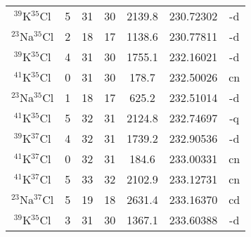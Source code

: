 \begin{table*}[htp]
\begin{tabular}{ccccccc}
$^{39}$K$^{35}$Cl & 5 & 31 & 30 & 2139.8 & 230.72302 & -d \\
$^{23}$Na$^{35}$Cl & 2 & 18 & 17 & 1138.6 & 230.77811 & -d \\
$^{39}$K$^{35}$Cl & 4 & 31 & 30 & 1755.1 & 232.16021 & -d \\
$^{41}$K$^{35}$Cl & 0 & 31 & 30 & 178.7 & 232.50026 & cn \\
$^{23}$Na$^{35}$Cl & 1 & 18 & 17 & 625.2 & 232.51014 & -d \\
$^{41}$K$^{35}$Cl & 5 & 32 & 31 & 2124.8 & 232.74697 & -q \\
$^{39}$K$^{37}$Cl & 4 & 32 & 31 & 1739.2 & 232.90536 & -d \\
$^{41}$K$^{37}$Cl & 0 & 32 & 31 & 184.6 & 233.00331 & cn \\
$^{41}$K$^{37}$Cl & 5 & 33 & 32 & 2102.9 & 233.12731 & cn \\
$^{23}$Na$^{37}$Cl & 5 & 19 & 18 & 2631.4 & 233.16370 & cd \\
$^{39}$K$^{35}$Cl & 3 & 31 & 30 & 1367.1 & 233.60388 & -d \\
\hline
\end{tabular}

\par 
\end{table*}
